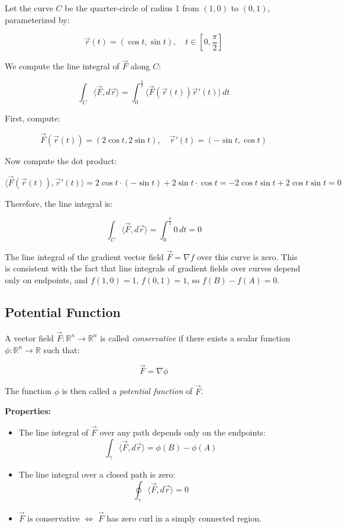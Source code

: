 Let the curve \( C \) be the quarter-circle of radius 1 from \( (1, 0) \) to \( (0, 1) \), parameterized by:

\[
\vec{r}(t) = (\cos t, \sin t), \quad t \in \left[0, \frac{\pi}{2}\right]
\]

We compute the line integral of \( \vec{F} \) along \( C \):

\[
\int_C \langle \vec{F}, d\vec{r}\rangle = \int_0^{\frac{\pi}{2}} \langle\vec{F}(\vec{r}(t)) \vec{r}'(t) \rangle\, dt
\]

First, compute:

\[
\vec{F}(\vec{r}(t)) = (2\cos t, 2\sin t), \quad \vec{r}'(t) = (-\sin t, \cos t)
\]

Now compute the dot product:

\[
\langle\vec{F}(\vec{r}(t)), \vec{r}'(t)\rangle = 2\cos t \cdot (-\sin t) + 2\sin t \cdot \cos t = -2\cos t \sin t + 2\cos t \sin t = 0
\]

Therefore, the line integral is:

\[
\int_C \langle \vec{F}, d\vec{r}\rangle = \int_0^{\frac{\pi}{2}} 0 \, dt = 0
\]

The line integral of the gradient vector field \( \vec{F} = \nabla f \) over this curve is zero. 
This is consistent with the fact that line integrals of gradient fields over 
curves depend only on endpoints, and 
\( f(1,0) = 1 \), \( f(0,1) = 1 \), so \( f(B) - f(A) = 0 \).


\subsection{Potential Function}

A vector field \( \vec{F} : \mathbb{R}^n \to \mathbb{R}^n \) is called \emph{conservative} if there exists a scalar function \( \phi : \mathbb{R}^n \to \mathbb{R} \) such that:

\[
\vec{F} = \nabla \phi
\]

The function \( \phi \) is then called a \emph{potential function} of \( \vec{F} \).

\textbf{Properties:}
\begin{itemize}[label=\(-\)]
    \item The line integral of \( \vec{F} \) over any path depends only on the endpoints:
    \[
    \int_\gamma \langle \vec{F}, d\vec{r} \rangle = \phi(B) - \phi(A)
    \]
    \item The line integral over a closed path is zero:
    \[
    \oint_\gamma \langle \vec{F}, d\vec{r} \rangle = 0
    \]
    \item \( \vec{F} \) is conservative \( \Leftrightarrow \) \( \vec{F} \) has zero curl in a simply connected region.
\end{itemize}

